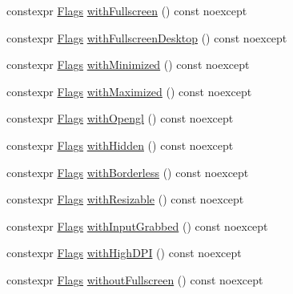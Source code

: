 \begin{DoxyCompactItemize}
\item 
constexpr \mbox{\hyperlink{structrolmodl_1_1win_1_1_flags}{Flags}} \mbox{\hyperlink{structrolmodl_1_1win_1_1_flags_a6a613cbcc860f9019217481868e499a8}{with\+Fullscreen}} () const noexcept
\item 
constexpr \mbox{\hyperlink{structrolmodl_1_1win_1_1_flags}{Flags}} \mbox{\hyperlink{structrolmodl_1_1win_1_1_flags_ae8fbe3a0abf4f19ba3fe1e331b162acf}{with\+Fullscreen\+Desktop}} () const noexcept
\item 
constexpr \mbox{\hyperlink{structrolmodl_1_1win_1_1_flags}{Flags}} \mbox{\hyperlink{structrolmodl_1_1win_1_1_flags_a5644d56c5e448a7e79ff0fdf24dd73e4}{with\+Minimized}} () const noexcept
\item 
constexpr \mbox{\hyperlink{structrolmodl_1_1win_1_1_flags}{Flags}} \mbox{\hyperlink{structrolmodl_1_1win_1_1_flags_a957aae3e030c55c8a8814c3ff688eede}{with\+Maximized}} () const noexcept
\item 
constexpr \mbox{\hyperlink{structrolmodl_1_1win_1_1_flags}{Flags}} \mbox{\hyperlink{structrolmodl_1_1win_1_1_flags_aa8fa7a9010a4cf3d1bf67a2199371312}{with\+Opengl}} () const noexcept
\item 
constexpr \mbox{\hyperlink{structrolmodl_1_1win_1_1_flags}{Flags}} \mbox{\hyperlink{structrolmodl_1_1win_1_1_flags_a237439315fcc5ecafeab0eae304b1fab}{with\+Hidden}} () const noexcept
\item 
constexpr \mbox{\hyperlink{structrolmodl_1_1win_1_1_flags}{Flags}} \mbox{\hyperlink{structrolmodl_1_1win_1_1_flags_a5c4f00d4a5719a7ea9cb598da639c1c2}{with\+Borderless}} () const noexcept
\item 
constexpr \mbox{\hyperlink{structrolmodl_1_1win_1_1_flags}{Flags}} \mbox{\hyperlink{structrolmodl_1_1win_1_1_flags_a2930264d9addddb6b90fe6fe70d0c16f}{with\+Resizable}} () const noexcept
\item 
constexpr \mbox{\hyperlink{structrolmodl_1_1win_1_1_flags}{Flags}} \mbox{\hyperlink{structrolmodl_1_1win_1_1_flags_aab417768b97fc6f0e5d97e1cc6fe449c}{with\+Input\+Grabbed}} () const noexcept
\item 
constexpr \mbox{\hyperlink{structrolmodl_1_1win_1_1_flags}{Flags}} \mbox{\hyperlink{structrolmodl_1_1win_1_1_flags_aab0e6903ddcb42c61a26dd0dcc8a702a}{with\+High\+D\+PI}} () const noexcept
\item 
constexpr \mbox{\hyperlink{structrolmodl_1_1win_1_1_flags}{Flags}} \mbox{\hyperlink{structrolmodl_1_1win_1_1_flags_a4fae094b5826ef684f8928004787be7c}{without\+Fullscreen}} () const noexcept
\item 

\end{DoxyCompactItemize}
